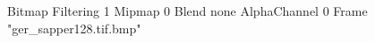 {Bitmap
	{Filtering 1}
	{Mipmap 0}
	{Blend none}
	{AlphaChannel 0}
	{Frame "ger_sapper128.tif.bmp"}
}
